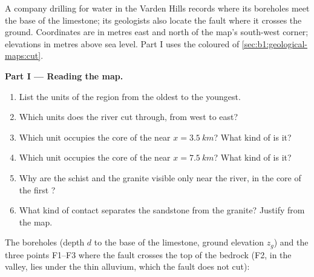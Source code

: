 \begin{problem}
\label{pb:b1:geological-maps:1}
A company drilling for water in the Varden Hills records where its boreholes
meet the base of the limestone; its geologists also locate the fault where it
crosses the ground. Coordinates are in metres east and north of the map's
south-west corner; elevations in metres above sea level. Part I uses the
coloured  of \cref{sec:b1:geological-maps:cut}.

\medskip
\noindent\textbf{Part I --- Reading the map.}
\begin{enumerate}
  \item List the units of the region from the oldest to the youngest.
  \item Which units does the river cut through, from west to east?
  \item Which unit occupies the core of the  near $x = \qty{3.5}{km}$?
        What kind of  is it?
  \item Which unit occupies the core of the  near $x = \qty{7.5}{km}$?
        What kind of  is it?
  \item Why are the schist and the granite visible only near the river, in
        the core of the first ?
  \item What kind of contact separates the sandstone from the granite?
        Justify from the map.
\end{enumerate}

\medskip
\noindent The boreholes (depth $d$ to the base of the limestone, ground
elevation $z_g$) and the three points F1--F3 where the fault crosses the
top of the bedrock (F2, in the valley, lies under the thin alluvium, which
the fault does not cut):


\end{problem}
